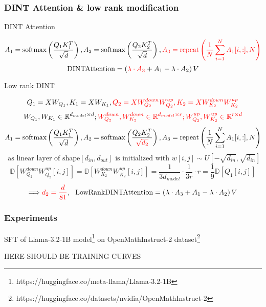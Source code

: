 \documentclass[10pt]{beamer}
\begin{document}
\begin{frame}
    \frametitle{DINT Attention \& low rank modification}

    \begin{block}{DINT Attention}
        \vspace{-0.5cm}
        
        $$A_1 = \text{softmax}\left(\frac{Q_1 K_1^T}{\sqrt{d}}\right), A_2 = \text{softmax}\left(\frac{Q_2 K_2^T}{\sqrt{d}}\right), \textcolor{red}{A_3 = \text{repeat}\left(\frac{1}{N}\sum\limits_{i=1}^{N}A_1[i,:], N\right)}$$
        $$\text{DINTAttention} = \left(\textcolor{red}{\lambda\cdot A_3} + A_1 - \lambda\cdot A_2 \right) V$$

    \end{block}

    \begin{block}{Low rank DINT}
        \vspace{-0.5cm}

        $$Q_1 = X W_{Q_1}, K_1 = X W_{K_1}, \textcolor{red}{Q_2 = XW_{Q_2}^{down} W_{Q_2}^{up}, K_2 = XW_{K_2}^{down} W_{K_2}^{up}}$$
        $$W_{Q_1}, W_{K_1} \in \mathbb{R}^{d_{model} \times d}; \textcolor{red}{W_{Q_2}^{down}, W_{K_2}^{down} \in \mathbb{R}^{d_{model} \times r}; W_{Q_2}^{up}, W_{K_2}^{up} \in \mathbb{R}^{r \times d}} $$
        $$A_1 = \text{softmax}\left(\frac{Q_1 K_1^T}{\sqrt{d}}\right), A_2 = \text{softmax}\left(\frac{Q_2 K_2^T}{\textcolor{red}{\sqrt{d_2}}}\right), A_3 = \text{repeat}\left(\frac{1}{N}\sum\limits_{i=1}^{N}A_1[i,:], N\right)$$
        $$\text{ as linear layer of shape} [d_{in}, d_{out}] \text{ is initialized with } w[i,j] \sim U[-\sqrt{d_{in}}, \sqrt{d_{in}}]$$ $$\mathbb{D}[W_{Q_2}^{down} W_{Q_2}^{up}[i,j]] = \mathbb{D}[W_{K_2}^{down} W_{K_2}^{up}[i,j]] = \frac{1}{3 d_{model}}\cdot \frac{1}{3 r}\cdot r = \frac{1}{9}\mathbb{D}[Q_1[i,j]]$$
        $$\Longrightarrow \textcolor{red}{d_2 = \frac{d}{81}},~~ \text{LowRankDINTAttention} = \left(\lambda\cdot A_3 + A_1 - \lambda\cdot A_2 \right) V$$

    \end{block}
        
\end{frame}


\begin{frame}
    \frametitle{Experiments}
    SFT of Llama-3.2-1B model\footnote{https://huggingface.co/meta-llama/Llama-3.2-1B} on OpenMathInstruct-2 dataset\footnote{https://huggingface.co/datasets/nvidia/OpenMathInstruct-2}
    \begin{center}
        HERE SHOULD BE TRAINING CURVES
    \end{center}
        
\end{frame}
\end{document}
